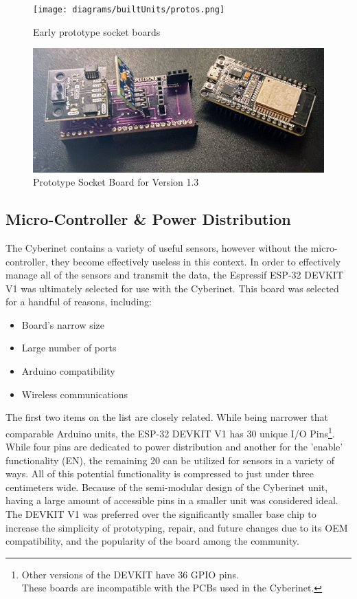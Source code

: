 \begin{figure}
    \centering
    \texttt{[image: diagrams/builtUnits/protos.png]}
    \caption{Early prototype socket boards}
    \label{fig:protoBoard}
\end{figure}


\begin{figure}
    \centering
    \includegraphics[scale=0.15]{diagrams/builtUnits/protoBoard.JPG}
    \caption{Prototype Socket Board for Version 1.3}
    \label{fig:protoBoard2}
\end{figure}

\subsection{Micro-Controller \& Power Distribution}

The Cyberinet contains a variety of useful sensors, however without the micro-controller, they become effectively useless in this context. In order to effectively manage all of the sensors and transmit the data, the Espressif ESP-32 DEVKIT V1 was ultimately selected for use with the Cyberinet. This board was selected for a handful of reasons, including:

\begin{itemize}
    \item Board's narrow size
    \item Large number of ports
    \item Arduino compatibility
    \item Wireless communications
\end{itemize}

The first two items on the list are closely related. While being narrower that comparable Arduino units, the ESP-32 DEVKIT V1 has 30 unique I/O Pins\footnote{Other versions of the DEVKIT have 36 GPIO pins. \\These boards are incompatible with the PCBs used in the Cyberinet.}. While four pins are dedicated to power distribution and another for the 'enable' functionality (EN), the remaining 20 can be utilized for sensors in a variety of ways. All of this potential functionality is compressed to just under three centimeters wide. Because of the semi-modular design of the Cyberinet unit, having a large amount of accessible pins in a smaller unit was considered ideal. The DEVKIT V1 was preferred over the significantly smaller base chip to increase the simplicity of prototyping, repair, and future changes due to its OEM compatibility, and the popularity of the board among the community.

